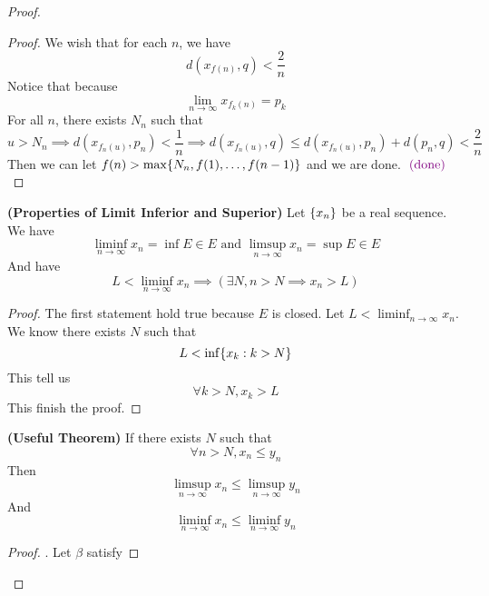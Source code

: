 \documentclass{report}
\begin{document}
\begin{proof}
\begin{proof}
We wish that for each $n$, we have
\begin{equation}
d(x_{f(n)},q)<\frac{2}{n}
\end{equation}
Notice that because 
\begin{equation}
  \lim_{n\to\infty}x_{f_k(n)}=p_k
\end{equation}
For all $n$, there exists  $N_n$ such that
 \begin{equation}
u>N_n\implies d(x_{f_n(u)},p_n)<\frac{1}{n}\implies d(x_{f_n(u)},q)\leq d(x_{f_n(u)},p_n)+d(p_n,q)<\frac{2}{n}
\end{equation}
Then we can let $f(n)>\max \{ N_n, f(1),\dots ,f(n-1) \}$ and we are done. $\textcolor{violet}{\text{ (done) }}$ 
\end{proof}
\begin{theorem}
\label{2.3.11}
\textbf{(Properties of Limit Inferior and Superior)} Let $\{ x_n \}$ be a real sequence. We have 
\begin{equation}
\liminf_{n\to\infty} x_n=\inf E\in E\text{ and }\limsup_{n\to\infty} x_n=\sup E\in E
\end{equation}
And have
\begin{equation}
L<\liminf_{n\to\infty}  x_n\implies (\exists N, n>N\implies x_n>L)
\end{equation}
\end{theorem}
\begin{proof}
The first statement hold true because  $E$ is closed. Let $L<\liminf_{n\to\infty}  x_n$. We know there exists $N$ such that
 \begin{equation}
L<\inf \{ x_k:k>N \}
\end{equation}
This tell us 
\begin{equation}
\forall k>N, x_k>L
\end{equation}
This finish the proof.
\end{proof}
\begin{theorem}
\label{2.3.12}
\textbf{(Useful Theorem)} If there exists $N$ such that
 \begin{equation}
\forall n>N, x_n\leq y_n
\end{equation}
Then
\begin{equation}
\limsup_{n\to\infty} x_n\leq \limsup_{n\to\infty} y_n
\end{equation}
And
\begin{equation}
\liminf_{n\to\infty} x_n\leq \liminf_{n\to\infty} y_n
\end{equation}
\end{theorem}
\begin{proof}
. Let $\beta $ satisfy

\end{proof}
\end{proof}
\end{document}
